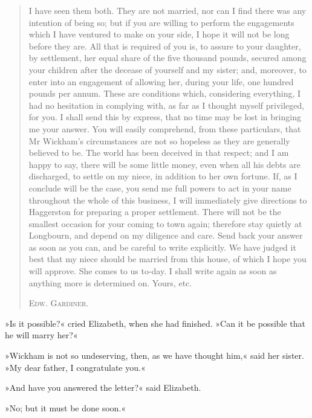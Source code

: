 \begin{quotation}

I have seen them both. They are not married, nor can I find there was any intention of being so; but if you are willing to perform the engagements which I have ventured to make on your side, I hope it will not be long before they are. All that is required of you is, to assure to your daughter, by settlement, her equal share of the five thousand pounds, secured among your children after the decease of yourself and my sister; and, moreover, to enter into an engagement of allowing her, during your life, one hundred pounds per annum. These are conditions which, considering everything, I had no hesitation in complying with, as far as I thought myself privileged, for you. I shall send this by express, that no time may be lost in bringing me your answer. You will easily comprehend, from these particulars, that Mr Wickham's circumstances are not so hopeless as they are generally believed to be. The world has been deceived in that respect; and I am happy to say, there will be some little money, even when all his debts are discharged, to settle on my niece, in addition to her own fortune. If, as I conclude will be the case, you send me full powers to act in your name throughout the whole of this business, I will immediately give directions to Haggerston for preparing a proper settlement. There will not be the smallest occasion for your coming to town again; therefore stay quietly at Longbourn, and depend on my diligence and care. Send back your answer as soon as you can, and be careful to write explicitly. We have judged it best that my niece should be married from this house, of which I hope you will approve. She comes to us to-day. I shall write again as soon as anything more is determined on. Yours, etc.

\begin{flushright}\scshape
Edw. Gardiner.
\end{flushright}

\end{quotation}

»Is it possible?« cried Elizabeth, when she had finished. »Can it be possible that he will marry her?«

»Wickham is not so undeserving, then, as we have thought him,« said her sister. »My dear father, I congratulate you.«

»And have you answered the letter?« said Elizabeth.

»No; but it must be done soon.«

